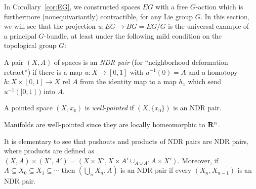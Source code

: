 \documentclass[a4paper,openany]{scrbook}
\begin{document}
In Corollary~\ref{cor:EG}, we constructed spaces $EG$ with a free $G$-action which is furthermore (nonequivariantly) contractible, for any Lie group $G$. In this section, we will see that the projection $u\colon EG \to BG=EG/G$ is the universal example of a principal $G$-bundle, at least under the following mild condition on the topological group $G$:

\begin{defn}
A pair $(X,A)$ of spaces is an \emph{NDR pair} (for ``neighborhood deformation retract'') if there is a map $u\colon X \to [0,1]$ with $u^{-1}(0)=A$ and a homotopy $h\colon X \times [0,1] \to X$ rel $A$ from the identity map to a map $h_1$ which send $u^{-1}([0,1))$ into $A$.

A pointed space $(X,x_0)$ is \emph{well-pointed} if $(X,\{x_0\})$ is an NDR pair.
\end{defn}

\begin{example}
Manifolds are well-pointed since they are locally homeomorphic to $\mathbf R^n$.
\end{example}

It is elementary to see that pushouts and products of NDR pairs are NDR pairs, where products are defined as $(X,A) \times (X',A') = (X\times X',X \times A'\cup_{A \cup A'} A \times X')$. Moreover, if $A \subseteq X_0 \subseteq X_1 \subseteq \cdots$ then $(\bigcup_{n} X_n,A)$ is an NDR pair if every $(X_n,X_{n-1})$ is an NDR pair.
\end{document}
